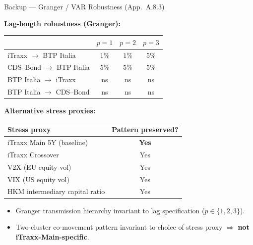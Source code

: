 \documentclass[aspectratio=169,11pt]{beamer}
\newcommand{\hlt}[1]{\textcolor{edhecred}{\textbf{#1}}}     %
\begin{document}
\begin{frame}[t]{Backup --- Granger / VAR Robustness (App.\ A.8.3)}
\centering
\scriptsize
\vspace{0.10cm}

\begin{minipage}[t]{0.46\textwidth}
\centering
\textbf{Lag-length robustness (Granger):}\\[0.10cm]
\renewcommand{\arraystretch}{1.20}
\setlength{\tabcolsep}{4pt}
\begin{tabular}{lccc}
\toprule
                               & $p=1$ & $p=2$ & $p=3$ \\
\midrule
iTraxx $\to$ BTP Italia        & $1\%$ & $1\%$ & $5\%$ \\
CDS--Bond $\to$ BTP Italia     & $5\%$ & $5\%$ & $5\%$ \\
BTP Italia $\to$ iTraxx        & ns    & ns    & ns \\
BTP Italia $\to$ CDS--Bond     & ns    & ns    & ns \\
\bottomrule
\end{tabular}
\end{minipage}\hfill
\begin{minipage}[t]{0.50\textwidth}
\centering
\textbf{Alternative stress proxies:}\\[0.10cm]
\renewcommand{\arraystretch}{1.20}
\setlength{\tabcolsep}{4pt}
\begin{tabular}{lc}
\toprule
Stress proxy                            & Pattern preserved? \\
\midrule
iTraxx Main 5Y (baseline)               & \hlt{Yes} \\
iTraxx Crossover                        & Yes \\
V2X (EU equity vol)                     & Yes \\
VIX (US equity vol)                     & Yes \\
HKM intermediary capital ratio          & Yes \\
\bottomrule
\end{tabular}
\end{minipage}

\vspace{0.40cm}

\begin{itemize}\itemsep=0.06cm\footnotesize
  \item Granger transmission hierarchy invariant to lag specification ($p \in \{1,2,3\}$).
  \item Two-cluster co-movement pattern invariant to choice of stress proxy
        $\Rightarrow$ \hlt{not iTraxx-Main-specific}.
\end{itemize}

\end{frame}
\end{document}
